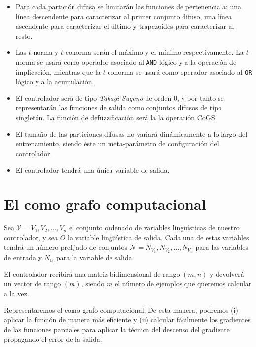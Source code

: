 \begin{itemize}
	\item Para cada partición difusa se limitarán las funciones de pertenencia a: una línea descendente para caracterizar al primer conjunto difuso, una línea ascendente para caracterizar el último y trapezoides para caracterizar al resto.
	\item Las $t$-norma y $t$-conorma serán el máximo y el mínimo respectivamente. La $t$-norma se usará como operador asociado al \texttt{AND} lógico y a la operación de implicación, mientras que la $t$-conorma se usará como operador asociado al \texttt{OR} lógico y a la acumulación.
	\item El controlador será de tipo \textit{Takagi-Sugeno} de orden $0$, y por tanto se representarán las funciones de salida como conjuntos difusos de tipo singletón. La función de defuzzificación será la la operación CoGS.
	\item El tamaño de las particiones difusas no variará dinámicamente a lo largo del entrenamiento, siendo éste un meta-parámetro de configuración del controlador.
	\item El controlador tendrá una única variable de salida.
\end{itemize}

\section{El  como grafo computacional}

Sea $\mathcal{V} = {V_1, V_2, \ldots, V_n}$ el conjunto ordenado de variables lingüísticas de nuestro controlador, y sea $O$ la variable lingüística de salida. Cada una de estas variables tendrá un número prefijado de conjuntos $\mathcal{N} = {N_{V_1}, N_{V_2}, \ldots, N_{V_n}}$ para las variables de entrada y $N_O$ para la variable de salida.

El controlador recibirá una matriz bidimensional de rango $(m, n)$ y devolverá un vector de rango $(m)$, siendo $m$ el número de ejemplos que queremos calcular a la vez.

Representaremos el  como grafo computacional. De esta manera, podremos (i) aplicar la función de manera más eficiente y (ii) calcular fácilmente los gradientes de las funciones parciales para aplicar la técnica del descenso del gradiente propagando el error de la salida.

